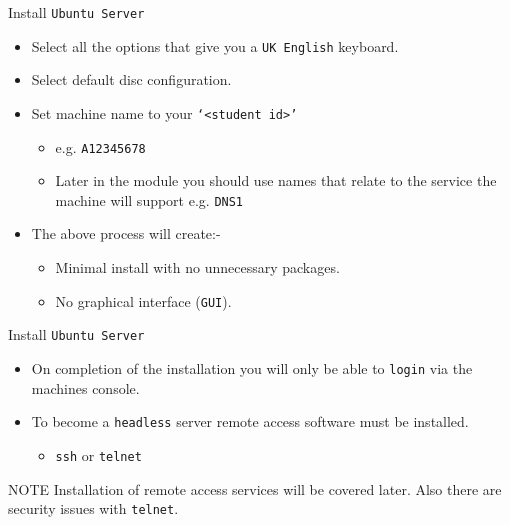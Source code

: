 \documentclass[aspectratio=169]{beamer}
\begin{document}
\begin{frame}{Install \texttt{Ubuntu Server}}
  \begin{itemize}
    \item Select all the options that give you a \texttt{UK English} keyboard.
    \item Select default disc configuration.
    \item Set machine name to your \texttt{`<student id>'}
      \begin{itemize}
        \item e.g. \texttt{A12345678}
        \item Later in the module you should use names that relate to the service the machine will support e.g. \texttt{DNS1}
      \end{itemize}
    \item The above process will create:-
      \begin{itemize}
        \item Minimal install with no unnecessary packages.
        \item No graphical interface (\texttt{GUI}).
      \end{itemize}
  \end{itemize}
\end{frame}

\begin{frame}{Install \texttt{Ubuntu Server}}
  \begin{itemize}
    \item On completion of the installation you will only be able to \texttt{login} via the machines console.
    \item To become a \texttt{headless} server remote access software must be installed.
      \begin{itemize}
        \item \texttt{ssh} or \texttt{telnet}
      \end{itemize}
  \end{itemize}
  \begin{block}{NOTE}
    Installation of remote access services will be covered later. Also there are security issues with \texttt{telnet}. 
  \end{block}
\end{frame}
\end{document}
